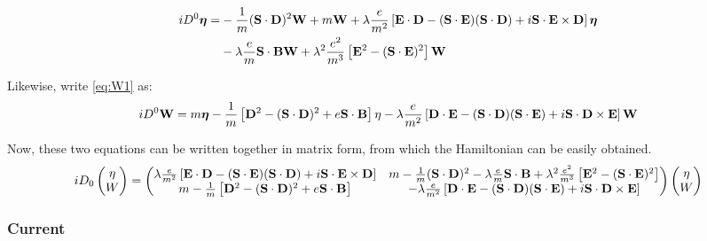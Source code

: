 \begin{equation}
\begin{split}
iD^0 \mbox{\boldmath$ \eta $} =&	-\frac{1}{m} (\mathbf{S} \cdot \mathbf{D})^2 \mathbf{W} 
								+ m\mathbf{W} 
								+ \lambda \frac{e}{m^2} \left [ \mathbf{E} \cdot \mathbf{D} - (\mathbf{S} \cdot \mathbf{E})( \mathbf{S} \cdot \mathbf{D}) + i \mathbf{S} \cdot \mathbf{E} \times \mathbf{D} \right ] \mbox{\boldmath$ \eta $} 	\\
							&	- \lambda \frac{e}{m} \mathbf{S} \cdot \mathbf{B} \mathbf{W}
								+ \lambda^2 \frac{e^2}{m^3} \left [ \mathbf{E}^2 - (\mathbf{S} \cdot \mathbf{E})^2 \right ] \mathbf{W}
\end{split}
\end{equation}

Likewise, write \eqref{eq:W1} as:
\begin{equation}
iD^0 \mathbf{W} =	m\mbox{\boldmath$ \eta $}
		- \frac{1}{m}\left [ \mathbf{D}^2 - (\mathbf{S} \cdot \mathbf{D})^2 + e \mathbf{S} \cdot \mathbf{B} \right ] \mathbf{\eta}
		- \lambda \frac{e}{m^2} \left [ \mathbf{D} \cdot \mathbf{E} - (\mathbf{S} \cdot \mathbf{D}) (\mathbf{S} \cdot \mathbf{E}) + i \mathbf{S} \cdot \mathbf{D} \times \mathbf{E} \right ] \mathbf{W}
\end{equation}

Now, these two equations can be written together in matrix form, from which the Hamiltonian can be easily obtained.
\begin{equation*}
iD_0
\begin{pmatrix}
\eta	\\	W
\end{pmatrix} 
=
\begin{pmatrix}
	\lambda \frac{e}{m^2} \left [ \mathbf{E} \cdot \mathbf{D} - (\mathbf{S} \cdot \mathbf{E})( \mathbf{S} \cdot \mathbf{D}) + i \mathbf{S} \cdot \mathbf{E} \times \mathbf{D} \right ]
&
	m
	-\frac{1}{m} (\mathbf{S} \cdot \mathbf{D})^2 
	- \lambda \frac{e}{m} \mathbf{S} \cdot \mathbf{B}
	+ \lambda^2 \frac{e^2}{m^3} \left [ \mathbf{E}^2 - (\mathbf{S} \cdot \mathbf{E})^2 \right ] 
\\
	m
	- \frac{1}{m}\left [ \mathbf{D}^2 - (\mathbf{S} \cdot \mathbf{D})^2 + e \mathbf{S} \cdot \mathbf{B} \right ] 
&
	- \lambda \frac{e}{m^2} \left [ \mathbf{D} \cdot \mathbf{E} - (\mathbf{S} \cdot \mathbf{D}) (\mathbf{S} \cdot \mathbf{E}) + i \mathbf{S} \cdot \mathbf{D} \times \mathbf{E} \right ] 
\end{pmatrix}
\begin{pmatrix}
\eta	\\	W
\end{pmatrix}
\end{equation*}

\subsubsection{Current}

